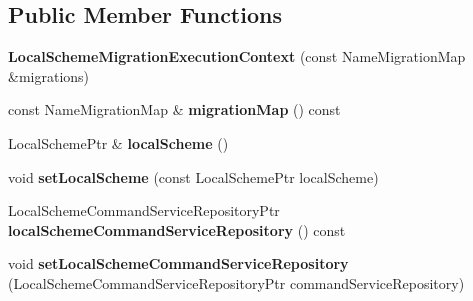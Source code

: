 \subsection*{Public Member Functions}
\begin{DoxyCompactItemize}
\item 
\mbox{\label{class_q_sql_migrator_1_1_migration_execution_1_1_local_scheme_migration_execution_context_a8faffb10ca7e8dc5a0341fba94630472}} 
{\bfseries Local\+Scheme\+Migration\+Execution\+Context} (const Name\+Migration\+Map \&migrations)
\item 
\mbox{\label{class_q_sql_migrator_1_1_migration_execution_1_1_local_scheme_migration_execution_context_abab180c89dc6f6a3ef9f2598b3f9a359}} 
const Name\+Migration\+Map \& {\bfseries migration\+Map} () const
\item 
\mbox{\label{class_q_sql_migrator_1_1_migration_execution_1_1_local_scheme_migration_execution_context_a346bd3c0b58068c78c7272f55a1ceeab}} 
Local\+Scheme\+Ptr \& {\bfseries local\+Scheme} ()
\item 
\mbox{\label{class_q_sql_migrator_1_1_migration_execution_1_1_local_scheme_migration_execution_context_aa044569f94f1576901612ab8afea4e5f}} 
void {\bfseries set\+Local\+Scheme} (const Local\+Scheme\+Ptr local\+Scheme)
\item 
\mbox{\label{class_q_sql_migrator_1_1_migration_execution_1_1_local_scheme_migration_execution_context_aaa33d5a26dc008b3550b04c9454c3d9d}} 
Local\+Scheme\+Command\+Service\+Repository\+Ptr {\bfseries local\+Scheme\+Command\+Service\+Repository} () const
\item 
\mbox{\label{class_q_sql_migrator_1_1_migration_execution_1_1_local_scheme_migration_execution_context_aa57118459a84d5b00620a954516d2323}} 
void {\bfseries set\+Local\+Scheme\+Command\+Service\+Repository} (Local\+Scheme\+Command\+Service\+Repository\+Ptr command\+Service\+Repository)
\end{DoxyCompactItemize}


